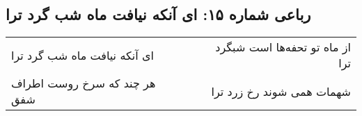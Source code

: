 \begin{center}
\section*{رباعی شماره ۱۵: ای آنکه نیافت ماه شب گرد ترا}
\label{sec:0015}
\begin{longtable}{l p{0.5cm} r}
ای آنکه نیافت ماه شب گرد ترا
&&
از ماه تو تحفه‌ها است شبگرد ترا
\\
هر چند که سرخ روست اطراف شفق
&&
شهمات همی شوند رخ زرد ترا
\\
\end{longtable}
\end{center}
